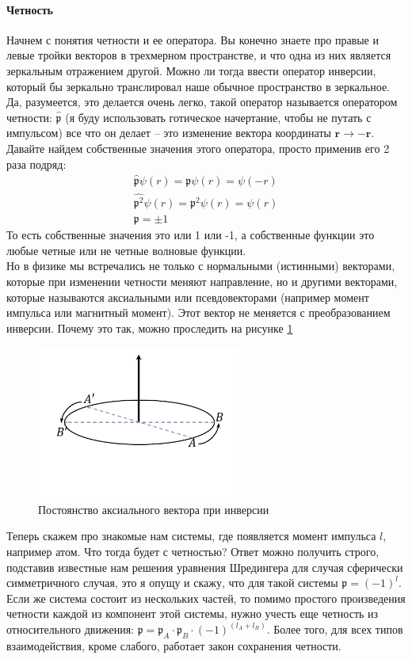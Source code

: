 \documentclass[12pt]{article}
\begin{document}
\paragraph{Четность} Начнем с понятия четности и ее оператора. Вы конечно знаете про правые и левые тройки векторов в трехмерном пространстве, и что одна из них является зеркальным отражением другой. Можно ли тогда ввести  оператор инверсии, который бы зеркально транслировал наше обычное пространство в зеркальное. Да, разумеется, это делается очень легко, такой оператор называется оператором четности: $\hat{\mathfrak{p}}$ (я буду использовать готическое начертание, чтобы не путать с импульсом) все что он делает -- это изменение вектора координаты $\textbf{r} \rightarrow -\textbf{r}$. Давайте найдем собственные значения этого оператора, просто применив его 2 раза подряд:
\begin{gather*}
\hat{\mathfrak{p}}\psi(r) = \mathfrak{p} \psi(r)=\psi(-r)\\
\hat{\mathfrak{p}^2}\psi(r) = \mathfrak{p}^2 \psi(r) = \psi(r)\\
\mathfrak{p} = \pm 1
\end{gather*}
То есть собственные значения это или 1 или -1, а собственные функции это любые четные или не четные волновые функции. \\
Но в физике мы встречались не только с нормальными (истинными) векторами, которые при изменении четности меняют направление, но и другими векторами, которые называются аксиальными или псевдовекторами (например момент импульса или магнитный момент). Этот вектор не меняется с преобразованием инверсии. Почему это так, можно проследить на рисунке \ref{fig:sem_08_pic_1}
\begin{figure}[h]
    \centering
    \includegraphics[width=0.6\textwidth,height=\textheight,keepaspectratio]{Seminar_08/pics/pic_01.pdf}
    \caption{Постоянство аксиального вектора при инверсии}
    \label{fig:sem_08_pic_1}
\end{figure}
Теперь скажем про знакомые нам системы, где появляется момент импульса $l$, например атом. Что тогда будет с четностью? Ответ можно получить строго, подставив известные нам решения уравнения Шредингера для случая сферически симметричного случая, это я опущу и скажу, что для такой системы $\mathfrak{p} = (-1)^l$. Если же система состоит из нескольких частей, то помимо простого произведения четности каждой из компонент этой системы, нужно учесть еще четность из относительного движения: $\mathfrak{p} = \mathfrak{p}_A\cdot\mathfrak{p}_B\cdot (-1)^{(l_A+l_B)}$. Более того, для всех типов взаимодействия, кроме слабого, работает закон сохранения четности. 
\end{document}
